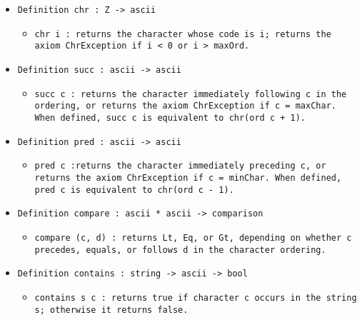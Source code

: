 \documentclass[11pt]{report}
\begin{document}
\begin{itemize}
\item  \texttt{Definition chr : Z -> ascii}

\begin{itemize}
\item  \begin{flushleft} \texttt{chr i : returns the character whose code is i; returns the axiom ChrException if i < 0 or i > maxOrd.}\end{flushleft}



\end{itemize}

\item  \texttt{Definition succ : ascii -> ascii}

\begin{itemize}
\item  \begin{flushleft}\texttt{succ c : returns the character immediately following c in the ordering, or returns the axiom ChrException if c = maxChar. When defined, succ c is equivalent to chr(ord c + 1).}\end{flushleft}
\end{itemize}

\item  \texttt{Definition pred : ascii -> ascii}

\begin{itemize}
\item \begin{flushleft} \texttt{pred c :returns the character immediately preceding c, or returns the axiom ChrException if c = minChar. When defined, pred c is equivalent to chr(ord c - 1).} \end{flushleft}
\end{itemize}

\item  \texttt{Definition compare : ascii * ascii -> comparison}

\begin{itemize}
\item  \begin{flushleft} \texttt{compare (c, d) : returns Lt, Eq, or Gt, depending on whether c precedes, equals, or follows d in the character ordering.} \end{flushleft}
\end{itemize}

\item  \texttt{Definition contains : string -> ascii -> bool}

\begin{itemize}
\item \begin{flushleft} \texttt{contains s c : returns true if character c occurs in the string s; otherwise it returns false.} \end{flushleft}
\end{itemize}


\end{itemize}
\end{document}
